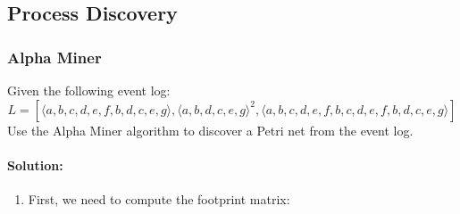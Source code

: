 \subsection{Process Discovery}
\subsubsection{Alpha Miner}
Given the following event log:
\[L = \left[ \langle a,b,c,d,e,f,b,d,c,e,g \rangle, \langle a,b,d,c,e,g \rangle^2, \langle a,b,c,d,e,f,b,c,d,e,f,b,d,c,e,g \rangle\right]\]
Use the Alpha Miner algorithm to discover a Petri net from the event log.
\paragraph{Solution:}
\begin{enumerate}
    \item First, we need to compute the footprint matrix:
\end{enumerate}
